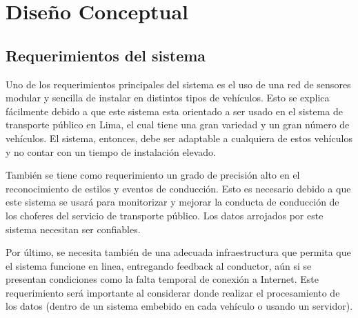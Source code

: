 \chapter{Diseño Conceptual}

\ifpdf
    \graphicspath{{Chapter3/Figuras/}{Chapter3/Figs/PDF/}{Chapter3/Figs/}}
\else
    \graphicspath{{Chapter3/Figs/Vector/}{Chapter3/Figs/}}
\fi

\section{Requerimientos del sistema}
Uno de los requerimientos principales del sistema es el uso de una red de sensores modular y sencilla de instalar en distintos tipos de vehículos. Esto se explica fácilmente debido a que este sistema esta orientado a ser usado en el sistema de transporte público en Lima, el cual tiene una gran variedad y un gran número de vehículos. El sistema, entonces, debe ser adaptable a cualquiera de estos vehículos y no contar con un tiempo de instalación elevado.

También se tiene como requerimiento un grado de precisión alto en el reconocimiento de estilos y eventos de conducción. Esto es necesario debido a que este sistema se usará para monitorizar y mejorar la conducta de conducción de los choferes del servicio de transporte público. Los datos arrojados por este sistema necesitan ser confiables.

Por último, se necesita también de una adecuada infraestructura que permita que el sistema funcione en linea, entregando feedback al conductor, aún si se presentan condiciones como la falta temporal de conexión a Internet. Este requerimiento será importante al considerar donde realizar el procesamiento de los datos (dentro de un sistema embebido en cada vehículo o usando un servidor).

